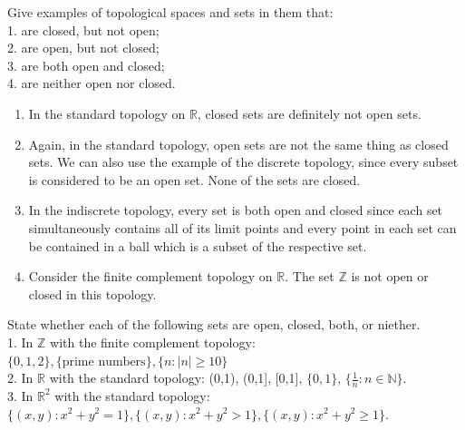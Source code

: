 \documentclass[letterpaper,12pt,twoside]{maths}
\begin{document}
\begin{exercise}[Exercise 3.18]
    Give examples of topological spaces and sets in
    them that:\\
1. are closed, but not open;\\
2. are open, but not closed;\\
3. are both open and closed; \\
4. are neither open nor closed. 
\end{exercise}

\begin{solution}
    \begin{enumerate}
        \item In the standard topology on $\mathbb{R}$, closed sets are
        definitely not open sets.
    
        \item Again, in the standard topology, open sets are not the same thing
        as closed sets. We can also use the example of the discrete topology,
        since every subset is considered to be an open set. None of the sets
        are closed.
    
        \item In the indiscrete topology, every set is both open and closed since
        each set simultaneously contains all of its limit points and every
        point in each set can be contained in a ball which is a subset of the
        respective set.
    
        \item Consider the finite complement topology on $\mathbb{R}$. The set
        $\mathbb{Z}$ is not open or closed in this topology. 
    \end{enumerate}
\end{solution}

\begin{exercise}[Exercise 3.19]
State whether each of the following sets are
open, closed, both, or niether.\\
1. In $\mathbb{Z}$ with the finite complement topology: $\{0, 1, 2\},
\{\text{prime numbers}\}, \{n : |n| \ge 10\}$\\
2. In $\mathbb{R}$ with the standard topology: (0,1), (0,1], [0,1],
$\{0,1\}$, $\{\frac{1}{n} : n \in \mathbb{N}\}$.\\
3. In $\mathbb{R}^2$ with the standard topology: $\{(x,y) : x^2 + y^2
= 1\}, \{(x,y) : x^2 + y^2 > 1\}, \{(x,y) : x^2 + y^2 \ge 1\}.$ 
\end{exercise}
\end{document}
